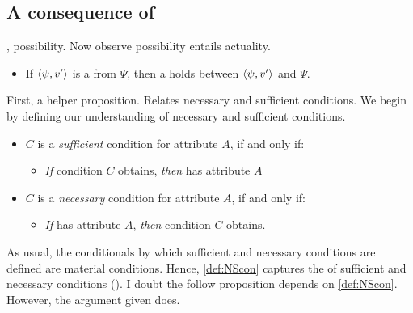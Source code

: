 \subsection{A consequence of \supportII{}}
\label{cha:fc:fc-sII}

\begin{note}
  \supportII{}, possibility.
  Now observe possibility entails actuality.

  \begin{itemize}
  \item
    If \(\langle \psi, v' \rangle\) is a \fc{} from \(\Psi\), then a \ros{} holds between \(\langle \psi, v' \rangle\) and \(\Psi\).
  \end{itemize}
\end{note}

\begin{note}
  First, a helper proposition.
  Relates necessary and sufficient conditions.
  We begin by defining our understanding of necessary and sufficient conditions.

  \begin{definition}
    \label{def:NScon}
    \vspace{-\baselineskip}
    \begin{itemize}
    \item
      \(C\) is a \emph{sufficient} condition for attribute \(A\), if and only if:
      \begin{itemize}
      \item
        \emph{If} condition \(C\) obtains, \emph{then} \vAgent{} has attribute \(A\)
      \end{itemize}
    \item
      \(C\) is a \emph{necessary} condition for attribute \(A\), if and only if:
      \begin{itemize}
      \item
        \emph{If} \vAgent{} has attribute \(A\), \emph{then} condition \(C\) obtains.
      \end{itemize}
    \end{itemize}
    \vspace{-\baselineskip}
  \end{definition}

  \noindent%
  As usual, the conditionals by which sufficient and necessary conditions are defined are material conditions.
  Hence, \autoref{def:NScon} captures the  of sufficient and necessary conditions
  (\cite[cf.][\S2]{Brennan:2022aa}).
  I doubt the follow proposition depends on \autoref{def:NScon}.
  However, the argument given does.


\end{note}
